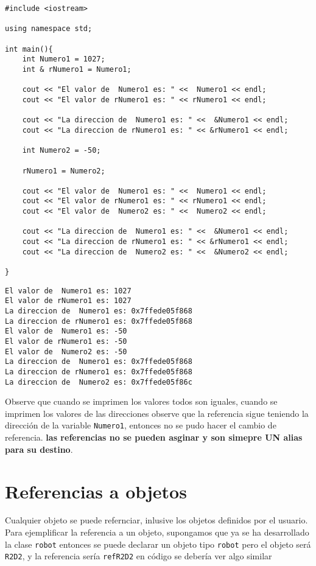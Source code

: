 \documentclass[12pt]{extarticle}
\newcommand{\<}{\langle}
\renewcommand{\>}{\rangle}
\theoremstyle{definition}
\begin{document}
\begin{lstlisting}
#include <iostream>

using namespace std;

int main(){
	int Numero1 = 1027;
	int & rNumero1 = Numero1;
	
	cout << "El valor de  Numero1 es: " <<  Numero1 << endl; 
	cout << "El valor de rNumero1 es: " << rNumero1 << endl; 
	
	cout << "La direccion de  Numero1 es: " <<  &Numero1 << endl; 
	cout << "La direccion de rNumero1 es: " << &rNumero1 << endl; 
	
	int Numero2 = -50;
	
	rNumero1 = Numero2;
	
	cout << "El valor de  Numero1 es: " <<  Numero1 << endl; 
	cout << "El valor de rNumero1 es: " << rNumero1 << endl;
	cout << "El valor de  Numero2 es: " <<  Numero2 << endl;
	
	cout << "La direccion de  Numero1 es: " <<  &Numero1 << endl; 
	cout << "La direccion de rNumero1 es: " << &rNumero1 << endl; 
	cout << "La direccion de  Numero2 es: " <<  &Numero2 << endl;
	
}
\end{lstlisting}



\begin{lstlisting}
El valor de  Numero1 es: 1027
El valor de rNumero1 es: 1027
La direccion de  Numero1 es: 0x7ffede05f868
La direccion de rNumero1 es: 0x7ffede05f868
El valor de  Numero1 es: -50
El valor de rNumero1 es: -50
El valor de  Numero2 es: -50
La direccion de  Numero1 es: 0x7ffede05f868
La direccion de rNumero1 es: 0x7ffede05f868
La direccion de  Numero2 es: 0x7ffede05f86c
\end{lstlisting}


Observe que cuando se imprimen los valores todos son iguales, cuando se imprimen los valores de las direcciones observe que la referencia sigue teniendo la dirección de la variable \verb|Numero1|, entonces no se pudo hacer el cambio de referencia. \textbf{las referencias no se pueden asginar y son simepre UN  alias para su destino}.


\section{Referencias a objetos}
Cualquier objeto se puede refernciar, inlusive los objetos definidos por el usuario. Para ejemplificar la referencia a un objeto, supongamos que ya se ha desarrollado la clase \verb|robot| entonces se puede declarar un objeto tipo \verb|robot| pero el objeto será \verb|R2D2|,  y la referencia sería \verb|refR2D2| en código se debería ver algo similar
\end{document}
